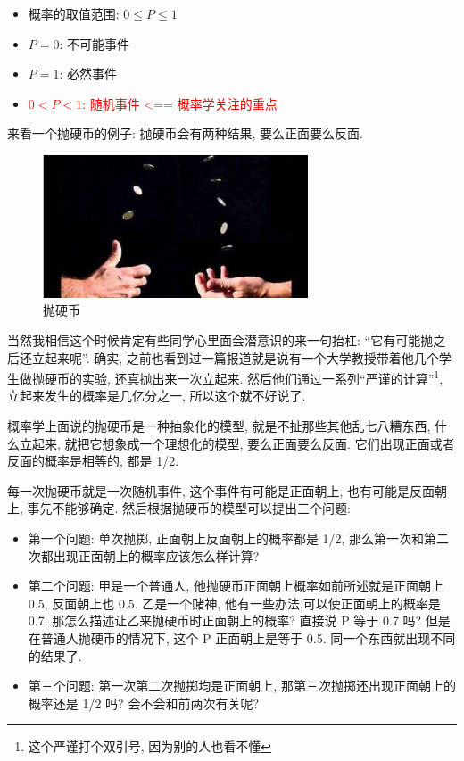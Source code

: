 \begin{itemize}
  \item 概率的取值范围: $0 \leq P \leq 1 $
  \item $P = 0$: 不可能事件 
  \item $P = 1$: 必然事件 
  \item \textcolor{red}{$0 < P < 1$: 随机事件 <== 概率学关注的重点}
\end{itemize}

来看一个抛硬币的例子: 抛硬币会有两种结果, 要么正面要么反面. 

\begin{figure}[ht]
  \centering
  \includegraphics[width=0.7\textwidth]{asset/28420cc4-afeb-4064-97ec-359a2ff38dee.png}
  \caption{抛硬币}
  \label{fig:img5_1}
\end{figure}

当然我相信这个时候肯定有些同学心里面会潜意识的来一句抬杠: “它有可能抛之后还立起来呢”. 确实, 之前也看到过一篇报道就是说有一个大学教授带着他几个学生做抛硬币的实验, 还真抛出来一次立起来. 然后他们通过一系列“严谨的计算”\footnote{这个严谨打个双引号, 因为别的人也看不懂}, 立起来发生的概率是几亿分之一, 所以这个就不好说了. 

概率学上面说的抛硬币是一种抽象化的模型, 就是不扯那些其他乱七八糟东西, 什么立起来, 就把它想象成一个理想化的模型, 要么正面要么反面. 它们出现正面或者反面的概率是相等的, 都是 1/2. 

每一次抛硬币就是一次随机事件, 这个事件有可能是正面朝上, 也有可能是反面朝上, 事先不能够确定. 然后根据抛硬币的模型可以提出三个问题:

\begin{itemize}
  \item 第一个问题: 单次抛掷, 正面朝上反面朝上的概率都是 1/2, 那么第一次和第二次都出现正面朝上的概率应该怎么样计算? 
  \item 第二个问题: 甲是一个普通人, 他抛硬币正面朝上概率如前所述就是正面朝上 0.5, 反面朝上也 0.5. 乙是一个赌神, 他有一些办法,可以使正面朝上的概率是 0.7. 那怎么描述让乙来抛硬币时正面朝上的概率? 直接说 P 等于 0.7 吗? 但是在普通人抛硬币的情况下, 这个 P 正面朝上是等于 0.5. 同一个东西就出现不同的结果了. 
  \item 第三个问题: 第一次第二次抛掷均是正面朝上, 那第三次抛掷还出现正面朝上的概率还是 1/2 吗? 会不会和前两次有关呢? 
\end{itemize}

